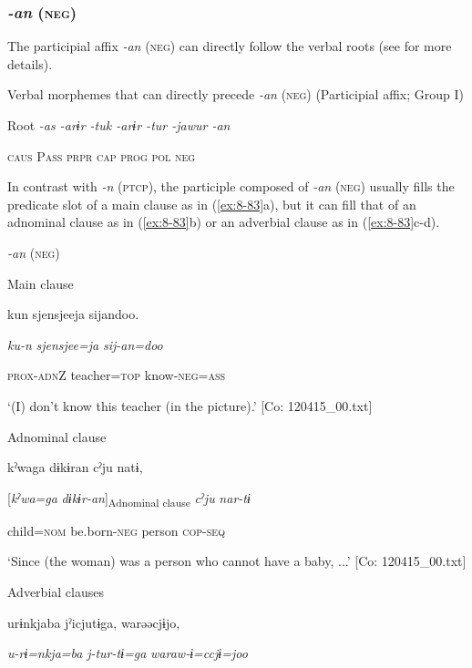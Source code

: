 \subsubsection{\textit{{}-an} (\textsc{neg})}

The participial affix \textit{{}-an} (\textsc{neg}) can directly follow the verbal roots (see  for more details).

\ea\label{ex:8-82}
  Verbal morphemes that can directly precede \textit{{}-an} (\textsc{neg}) (Participial affix; Group I)

  Root  \textit{{}-as  {}-arɨr  {}-tuk  {}-arɨr  {}-tur  {}-jawur  {}-an}

    \textsc{caus}  P\textsc{ass}  \textsc{prpr}  \textsc{cap}  \textsc{prog}  \textsc{pol}  \textsc{neg}

In contrast with \textit{{}-n} (\textsc{ptcp}), the participle composed of \textit{{}-an} (\textsc{neg}) usually fills the predicate slot of a main clause as in (\ref{ex:8-83}a), but it can fill that of an adnominal clause as in (\ref{ex:8-83}b) or an adverbial clause as in (\ref{ex:8-83}c-d).

\ea\label{ex:8-83}
  \textit{{}-an} (\textsc{neg})

  Main clause

\ea {\TM}
\glll  kun  {\textbar}sjensjee{\textbar}ja  sijandoo.

      \textit{ku-n}  \textit{sjensjee=ja}  \textit{sij-an=doo}

      \textsc{prox}-\textsc{adn}Z  teacher=\textsc{top}  know-\textsc{neg}=\textsc{ass}

\glt ‘(I) don’t know this teacher (in the picture).’ [Co: 120415\_00.txt]
\z

  Adnominal clause

\ex {\TM}
\glll  kˀwaga  dɨkɨran  cˀju  natɨ,

      [\textit{kˀwa=ga}  \textit{dɨkɨr-an}]\textsubscript{Adnominal clause}  \textit{cˀju}  \textit{nar-tɨ}

      child=\textsc{nom}  be.born-\textsc{neg}  person  \textsc{cop}-\textsc{seq}

\glt ‘Since (the woman) was a person who cannot have a baby, ...’ [Co: 120415\_00.txt]
\z

  Adverbial clauses

\ex {\TM}
\glll  urɨnkjaba  jˀicjutɨga,  warəəcjɨjo,

      \textit{u-rɨ=nkja=ba}  \textit{j-tur-tɨ=ga}  \textit{waraw-ɨ=ccjɨ=joo}

